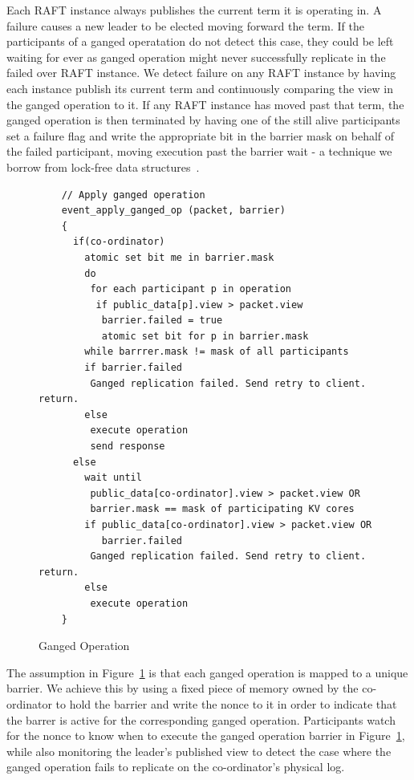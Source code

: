 \documentclass[pageno]{jpaper}
\begin{document}
Each RAFT instance always publishes the current term it is operating in. A
failure causes a new leader to be elected moving forward the term. If the
participants of a ganged operatation do not detect this case, they could be left
waiting for ever as ganged operation might never successfully replicate in the
failed over RAFT instance. We detect failure on any RAFT instance by having each
instance publish its current term and continuously comparing the view in the
ganged operation to it. If any RAFT instance has moved past that term, the
ganged operation is then terminated by having one of the still alive participants set a
failure flag and write the appropriate bit in the barrier mask on behalf of the
failed participant, moving execution past the barrier wait - a technique we
borrow from lock-free data structures~\cite{lock-free}.

\begin{figure}
  \centering
\begin{verbatim}
    // Apply ganged operation
    event_apply_ganged_op (packet, barrier)
    {
      if(co-ordinator)
        atomic set bit me in barrier.mask         
        do
         for each participant p in operation
          if public_data[p].view > packet.view
           barrier.failed = true 
           atomic set bit for p in barrier.mask
        while barrrer.mask != mask of all participants
        if barrier.failed
         Ganged replication failed. Send retry to client. return.
        else       
         execute operation
         send response
      else
        wait until 
         public_data[co-ordinator].view > packet.view OR
         barrier.mask == mask of participating KV cores
        if public_data[co-ordinator].view > packet.view OR
           barrier.failed
         Ganged replication failed. Send retry to client. return.
        else
         execute operation
    }
\end{verbatim}
\caption{Ganged Operation}
\label{fig:ganged_ops}
\end{figure}

The assumption in Figure~\ref{fig:ganged_ops} is that each ganged operation is
mapped to a unique barrier. We achieve this by using a fixed piece of memory
owned by the co-ordinator to hold the barrier and write the nonce to it in order
to indicate that the barrer is active for the corresponding ganged
operation. Participants watch for the nonce to know when to execute the
ganged operation barrier in Figure~\ref{fig:ganged_ops}, while also monitoring
the leader's published view to detect the case where the ganged operation fails
to replicate on the co-ordinator's physical log.
\end{document}
